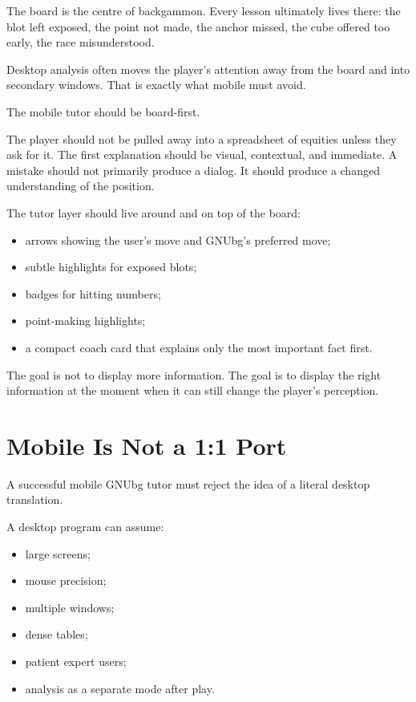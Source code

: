 \documentclass[11pt,a4paper]{article}
\begin{document}
The board is the centre of backgammon. Every lesson ultimately lives there: the blot left exposed, the point not made, the anchor missed, the cube offered too early, the race misunderstood.

Desktop analysis often moves the player's attention away from the board and into secondary windows. That is exactly what mobile must avoid.

The mobile tutor should be board-first.

The player should not be pulled away into a spreadsheet of equities unless they ask for it. The first explanation should be visual, contextual, and immediate. A mistake should not primarily produce a dialog. It should produce a changed understanding of the position.

The tutor layer should live around and on top of the board:

\begin{itemize}
  \item arrows showing the user's move and GNUbg's preferred move;
  \item subtle highlights for exposed blots;
  \item badges for hitting numbers;
  \item point-making highlights;
  \item a compact coach card that explains only the most important fact first.
\end{itemize}

The goal is not to display more information. The goal is to display the right information at the moment when it can still change the player's perception.

\section{Mobile Is Not a 1:1 Port}

A successful mobile GNUbg tutor must reject the idea of a literal desktop translation.

A desktop program can assume:

\begin{itemize}
  \item large screens;
  \item mouse precision;
  \item multiple windows;
  \item dense tables;
  \item patient expert users;
  \item analysis as a separate mode after play.
\end{itemize}
\end{document}
